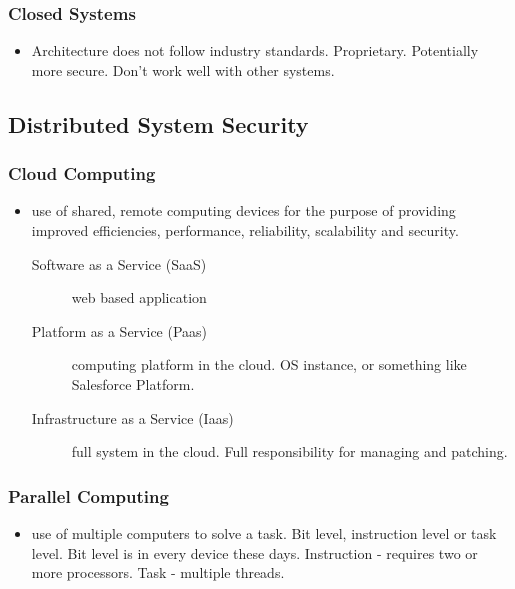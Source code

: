 \documentclass[11pt]{article}
\begin{document}
\subsubsection{Closed Systems}
\label{sec:org1697553}
\begin{itemize}
\item Architecture does not follow industry standards. Proprietary. Potentially more secure. Don't work well with other systems.
\end{itemize}
\subsection{Distributed System Security}
\label{sec:orge256111}
\subsubsection{Cloud Computing}
\label{sec:org913d7d6}
\begin{itemize}
\item use of shared, remote computing devices for the purpose of providing improved efficiencies, performance, reliability, scalability and security.
\begin{description}
\item[{Software as a Service (SaaS)}] web based application
\item[{Platform as a Service (Paas)}] computing platform in the cloud. OS instance, or something like Salesforce Platform.
\item[{Infrastructure as a Service (Iaas)}] full system in the cloud. Full responsibility for managing and patching.
\end{description}
\end{itemize}
\subsubsection{Parallel Computing}
\label{sec:org6410fdf}
\begin{itemize}
\item use of multiple computers to solve a task. Bit level, instruction level or task level. Bit level is in every device these days. Instruction - requires two or more processors. Task - multiple threads.
\end{itemize}
\end{document}
